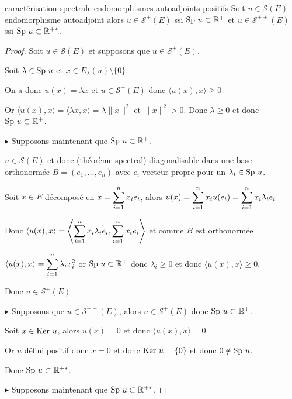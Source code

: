 \begin{theorement}{caractérisation spectrale endomorphismes autoadjoints positifs}{}
    Soit $u \in \mathscr S(E)$ endomorphisme autoadjoint 
    alors $u \in \mathscr S^+(E)$ ssi $\operatorname{Sp} \, u \subset \mathbb{R}^+$ et 
    $u \in \mathscr S^{++}(E)$ ssi $\operatorname{Sp} \, u \subset \mathbb{R}^{+*}$.
\end{theorement}

\begin{proof}
    Soit $u \in \mathscr S(E)$ et supposons que $u \in \mathscr S^+(E)$.

    Soit $\lambda \in \operatorname{Sp} \, u$ et $x \in E_\lambda(u) \setminus \{0\}$.

    On a donc $u(x) = \lambda x$ et $u \in \mathscr S^+(E)$ donc $\langle u(x), x \rangle \geqslant 0$

    Or $\langle u(x), x \rangle = \langle \lambda x, x \rangle = \lambda \| x \|^2$ et $\| x \|^2 > 0$.
    Donc $\lambda \geqslant 0$ et donc $\operatorname{Sp} \, u \subset \mathbb{R}^+$.

    \lvspace $\blacktriangleright$ Supposons maintenant que $\operatorname{Sp} \, u \subset \mathbb{R}^+$.

    $u \in \mathscr S(E)$ et donc (théorème spectral) diagonalisable dans une base orthonormée 
    $B = (e_1, \dots, e_n)$ avec $e_i$ vecteur propre pour un $\lambda_i \in \operatorname{Sp} \, u$. 

    Soit $x \in E$ décomposé en $x = \displaystyle \sum_{i = 1}^{n } x_i e_i$, alors 
    $u(x) = \displaystyle \sum_{i = 1}^{n} x_i u(e_i) = \displaystyle \sum_{i = 1}^{n} x_i \lambda_i e_i$ 

    Donc $\langle u(x), x \rangle = \left\langle \displaystyle \sum_{i = 1}^{n} x_i \lambda_i e_i, \displaystyle \sum_{i = 1}^{n} x_i e_i \right\rangle$ 
    et comme $B$ est orthonormée

    $\langle u(x), x \rangle = \displaystyle \sum_{i=1}^{n} \lambda_i x_i^2$ 
    or $\operatorname{Sp} \, u \subset \mathbb{R}^+$ donc $\lambda_i \geqslant 0$ et donc $\langle u(x), x \rangle \geqslant 0$.

    Donc $u \in \mathscr S^+(E)$.

    \lvspace $\blacktriangleright$ Supposons que $u \in \mathscr S^{++}(E)$, alors 
    $u \in \mathscr S^+(E)$ donc $\operatorname{Sp} \, u \subset \mathbb{R}^+$. 

    Soit $x \in \operatorname{Ker} \, u$, alors $u(x) = 0$ et donc $\langle u(x), x \rangle = 0$ 

    Or $u$ défini positif donc $x = 0$ et donc $\operatorname{Ker} \, u = \{0\}$ et donc $0 \notin \operatorname{Sp} \, u$.

    Donc $\operatorname{Sp} \, u \subset \mathbb{R}^{+*}$.

    \lvspace $\blacktriangleright$ Supposons maintenant que $\operatorname{Sp} \, u \subset \mathbb{R}^{+*}$. 


\end{proof}
